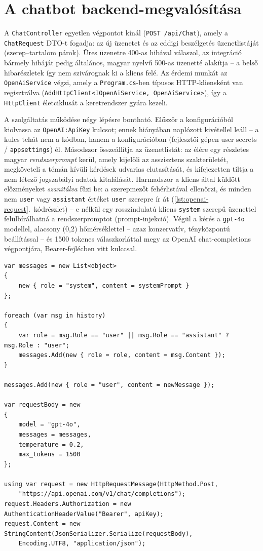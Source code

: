 \section{A chatbot backend-megvalósítása}
\label{sec:chat-backend}

A \texttt{ChatController} egyetlen végpontot kínál (\texttt{POST /api/Chat}), amely a
\texttt{ChatRequest} DTO-t fogadja: az új üzenetet és az eddigi beszélgetés üzenetlistáját
(szerep--tartalom párok). Üres üzenetre 400-as hibával válaszol, az integráció bármely hibáját
pedig általános, magyar nyelvű 500-as üzenetté alakítja -- a belső hibarészletek így nem
szivárognak ki a kliens felé. Az érdemi munkát az \texttt{OpenAiService} végzi, amely a
\texttt{Program.cs}-ben típusos HTTP-kliensként van regisztrálva
(\texttt{AddHttpClient<IOpenAiService, OpenAiService>}), így a \texttt{HttpClient} életciklusát a
keretrendszer gyára kezeli.

A szolgáltatás működése négy lépésre bontható. Először a konfigurációból kiolvassa az
\texttt{OpenAI:ApiKey} kulcsot; ennek hiányában naplózott kivétellel leáll -- a kulcs tehát nem a
kódban, hanem a konfigurációban (fejlesztői gépen user secrets / \texttt{appsettings}) él.
Másodszor összeállítja az üzenetlistát: az élére egy részletes magyar \emph{rendszerprompt} kerül,
amely kijelöli az asszisztens szakterületét, megköveteli a témán kívüli kérdések udvarias
elutasítását, és kifejezetten tiltja a nem létező jogszabályi adatok kitalálását. Harmadszor a
kliens által küldött előzményeket \emph{szanitálva} fűzi be: a szerepmezőt fehérlistával
ellenőrzi, és minden nem \texttt{user} vagy \texttt{assistant} értéket \texttt{user} szerepre ír
át (\ref{lst:openai-request}.~kódrészlet) -- e nélkül egy rosszindulatú kliens
\texttt{system} szerepű üzenettel felülbírálhatná a rendszerpromptot (prompt-injekció). Végül a
kérés a \texttt{gpt-4o} modellel, alacsony (0{,}2) hőmérséklettel -- azaz konzervatív,
tényközpontú beállítással -- és 1500 tokenes válaszkorláttal megy az OpenAI
chat-completions végpontjára, Bearer-fejlécben vitt kulccsal.

\begin{lstlisting}[language={[Sharp]C}, caption={Az előzmények szanitálása és a kérés összeállítása az \texttt{OpenAiService} osztályban (kivonat, megjegyzések nélkül)}, label={lst:openai-request}]
var messages = new List<object>
{
    new { role = "system", content = systemPrompt }
};

foreach (var msg in history)
{
    var role = msg.Role == "user" || msg.Role == "assistant" ? msg.Role : "user";
    messages.Add(new { role = role, content = msg.Content });
}

messages.Add(new { role = "user", content = newMessage });

var requestBody = new
{
    model = "gpt-4o",
    messages = messages,
    temperature = 0.2,
    max_tokens = 1500
};

using var request = new HttpRequestMessage(HttpMethod.Post,
    "https://api.openai.com/v1/chat/completions");
request.Headers.Authorization = new AuthenticationHeaderValue("Bearer", apiKey);
request.Content = new StringContent(JsonSerializer.Serialize(requestBody),
    Encoding.UTF8, "application/json");
\end{lstlisting}

